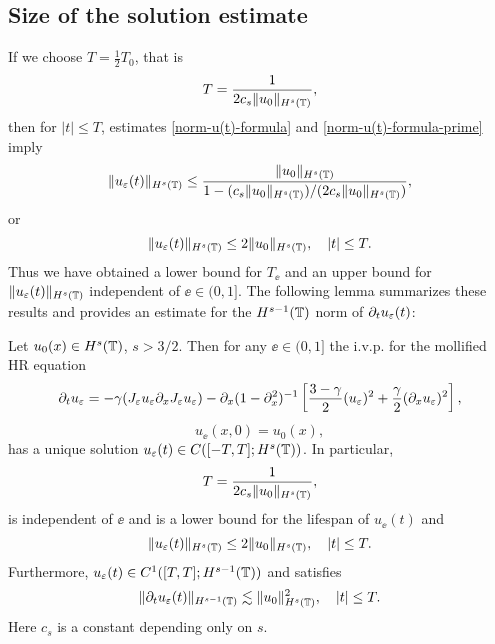 	\subsection{Size of the solution estimate} If we choose  $T=\frac12 T_0$, that is
	\begin{equation} 
		\label{T-def}
		T
		=
		\frac{1}{2 c_s \|u_0\|_{H^s(\mathbb{T})}},
	\end{equation}
	then for $|t| \le T$, estimates \eqref{norm-u(t)-formula} and
	\eqref{norm-u(t)-formula-prime} imply 
	\begin{equation*} 
		\label{u(t)-u(0)-bound}
		\|u_\varepsilon(t)\|_{H^s(\mathbb{T})}
		\le
		\frac{ \|u_0\|_{H^s(\mathbb{T})}}{1-(c_s\|u_0\|_{H^s(\mathbb{T})})/(2 c_s \|u_0\|_{H^s(\mathbb{T})})},
	\end{equation*}
	or 
	\begin{equation} 
		\|u_\varepsilon(t)\|_{H^s(\mathbb{T})}
		\le
		  2 \|u_0\|_{H^s(\mathbb{T})},
		\quad 
		|t| \le T.
	\end{equation}
	Thus we have obtained a lower bound for $T_\ee$ and an upper bound for
	$\|u_\varepsilon(t)\|_{H^s(\mathbb{T})}$ independent of $\ee\in (0, 1]$. The following
	lemma summarizes these results and provides an estimate for the
	$H^{s-1}(\mathbb{T})$ norm of $\partial_t u_\varepsilon(t)$:
	\begin{lemma}
		\label{hr_wp}
		Let  $u_0(x) \in  H^s(\mathbb{T})$, $s >3/2$. Then for any $\ee\in (0, 1]$
		the i.v.p. for the mollified HR equation 
		\begin{equation} 
			\label{hr-moli-2}
			\partial_t  u_\varepsilon 
			=
			-\gamma (J_\varepsilon u_\varepsilon \partial_x  J_\varepsilon  u_\varepsilon) - \partial_x (1-\partial_x^2)^{-1} \left
			[\frac{3-\gamma}{2}(u_\varepsilon)^2 + \frac{\gamma}{2}(\partial_x u_\varepsilon)^2
			\right ], 
		\end{equation} 
		\begin{equation} 
			\label{burgers-moli-data-2} 
			u_\ee(x, 0) = u_0 (x),
		\end{equation}
		has a unique solution $u_\varepsilon( t)\in C([-T, T]; H^s(\mathbb{T}))$. 
		In particular,
		\begin{equation} 
			\label{life-est}
			T
			=
			\frac{1}{2 c_s \|u_0\|_{H^s(\mathbb{T})}},
		\end{equation}
		is independent of $\ee$ and
		is a lower bound for the lifespan of $u_\ee( t)$ and
		\begin{equation}
			\label{u-e-Hs-bound}
			\|u_\varepsilon(t)\|_{H^s(\mathbb{T})}
			\le
			2 \|u_0 \|_{H^s(\mathbb{T})},
			\quad
			|t| \le T.
		\end{equation}
		Furthermore,  $u_\varepsilon( t)\in C^1([T, T]; H^{s-1}(\mathbb{T}))$ and 
		satisfies
		\begin{equation}
			\label{dt-u-e-Hs-bound}
			\|\partial_t u_\varepsilon(t)\|_{H^{s-1}(\mathbb{T})}
			\lesssim
			\|u_0 \|_{H^s(\mathbb{T})}^2,
			\quad
			|t| \le T.
		\end{equation}
		Here  $c_s$ is a constant depending only on $s$.
	\end{lemma}
